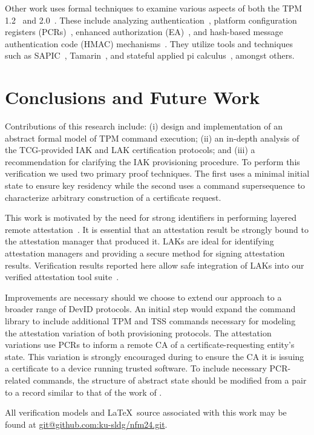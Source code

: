 \documentclass[runningheads]{llncs}
\begin{document}
Other work uses formal techniques to examine various aspects of both
the TPM 1.2~\citep{AuthAnalysis,PCRAnalysis} and
2.0~\citep{EAAnalysis,HMACAnalysis}.  These include analyzing
authentication~\citep{AuthAnalysis}, platform configuration registers
(PCRs)~\citep{PCRAnalysis}, enhanced authorization
(EA)~\citep{EAAnalysis}, and hash-based message authentication code
(HMAC) mechanisms~\citep{HMACAnalysis}. They utilize tools and
techniques such as SAPIC~\citep{kremer2016automated},
Tamarin~\citep{meier2013tamarin}, and stateful applied pi
calculus~\citep{Milner:99:Communicating-a}, amongst others.
% 
%
%
\section{Conclusions and Future Work}

Contributions of this research include: (i) design and implementation
of an abstract formal model of TPM command execution; (ii) an in-depth
analysis of the TCG-provided IAK and LAK certification protocols;
and (iii) a recommendation for clarifying the IAK provisioning
procedure.  To perform this verification we used two primary proof
techniques.  The first uses a minimal initial state to ensure key
residency while the second uses a command supersequence to characterize
arbitrary construction of a certificate request.

This work is motivated by the need for strong identifiers in
performing layered remote
attestation~\cite{Coker::Principles-of-R,Ramsdell:2019aa,helble2021flexible}.
It is essential that an attestation result be strongly bound to the
attestation manager that produced it. LAKs are ideal for identifying
attestation managers and providing a secure method for signing
attestation results.  Verification results reported here allow safe
integration of LAKs into our verified attestation tool
suite~\cite{petz2022innovations}.

Improvements are necessary should we choose to extend our approach to
a broader range of DevID protocols.  An initial step would expand the
command library to include additional TPM and TSS commands necessary
for modeling the attestation variation of both provisioning
protocols. The attestation variations use PCRs to inform a remote CA
of a certificate-requesting entity's state. This variation is strongly
encouraged during to ensure the CA it is issuing a certificate to a
device running trusted software. To include necessary PCR-related
commands, the structure of abstract state should be modified from a
pair to a record similar to that of the work of
\citet{PrivacyCAAnalysis-Hall}.

\medskip

\noindent All verification models and \LaTeX\ source associated with
this work may be found at \url{git@github.com:ku-sldg/nfm24.git}.

% 
% 
%
%
%

%

%
\end{document}
